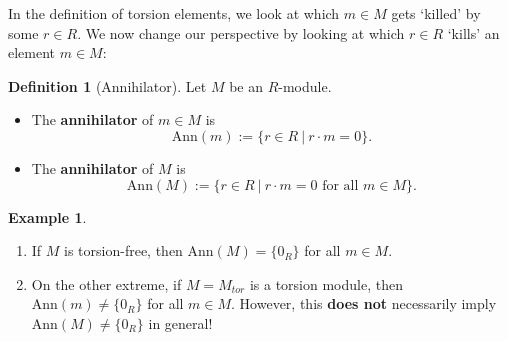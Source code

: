 \documentclass[11pt,openany]{book}
\theoremstyle{plain}
\theoremstyle{definition}
\newtheorem{definition}[definition]{Definition}
\newtheorem{example}[example]{Example}
\theoremstyle{remark}
\begin{document}
In the definition of torsion elements, we look at which $m \in M$ gets `killed' by some $r \in R$. We now change our perspective by looking at which $r \in R$ `kills' an element $m \in M$:
\begin{definition}[Annihilator]
    Let $M$ be an $R$-module.
    \begin{itemize}
        \item The {\bf annihilator} of $m\in M$ is 
        $$\mathrm{Ann}(m):=\{r\in R\ |\ r\cdot m=0\}.$$
        \item The {\bf annihilator} of $M$ is 
        $$\mathrm{Ann}(M):=\{r\in R\ |\ r\cdot m=0\text{ for all }m\in M\}.$$
    \end{itemize}
\end{definition}

\begin{example}
    \begin{enumerate}
        \item If $M$ is torsion-free, then $\mathrm{Ann}(M)=\{0_{R}\}$ for all $m\in M$.
        \item On the other extreme, if $M = M_{tor}$ is a torsion module, then
        $\mathrm{Ann}(m) \neq \{0_R\}$ for all $m \in M$. However, this {\bf does not} necessarily imply $\mathrm{Ann}(M) \neq \{0_R\}$ in general!
\end{enumerate}
\end{example}
\end{document}
